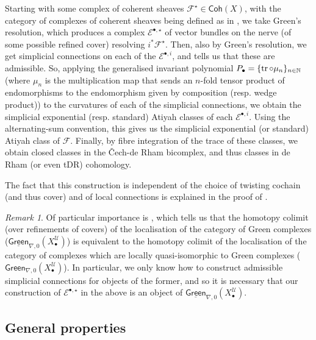 \documentclass[11pt,fleqn]{article}
\theoremstyle{plain}
\theoremstyle{definition}
\theoremstyle{remark}
\newtheorem{remark}[theorem]{Remark}
\numberwithin{equation}{theorem}
\newcommand{\cover}{\mathcal{U}}
\newcommand{\anotherbullet}{\star}
\newcommand{\gcohX}{\mathsf{Coh}(X)}
\newcommand{\greenzeroX}{\mathsf{Green}_{\nabla,0}(X_\bullet^\cover)}
\newcommand{\sgreenzeroX}{\underline{\mathsf{Green}}_{\nabla,0}(X_\bullet^\cover)}
\begin{document}
        Starting with some complex of coherent sheaves $\mathscr{F}^\anotherbullet\in\gcohX$, with the category of complexes of coherent sheaves being defined as in \cite[§4.1]{Hosgood2020a}, we take Green's resolution, which produces a complex $\mathcal{E}^{\bullet,\anotherbullet}$ of vector bundles on the nerve (of some possible refined cover) resolving $i^*\mathscr{F}^\anotherbullet$.
        Then, also by Green's resolution, we get simplicial connections on each of the $\mathcal{E}^{\bullet,i}$, and \cite[Theorem~3.5.5]{Hosgood2020a} tells us that these are admissible.
        So, applying the generalised invariant polynomial $P_\bullet = \{\tr\circ\mu_n\}_{n\in\mathbb{N}}$ (where $\mu_n$ is the multiplication map that sends an $n$-fold tensor product of endomorphisms to the endomorphism given by composition (resp. wedge product)) to the curvatures of each of the simplicial connections, we obtain the simplicial exponential (resp. standard) Atiyah classes of each $\mathcal{E}^{\bullet,i}$.
        Using the alternating-sum convention, this gives us the simplicial exponential (or standard) Atiyah class of $\mathscr{F}$.
        Finally, by fibre integration of the trace of these classes, we obtain closed classes in the Čech-de Rham bicomplex, and thus classes in de Rham (or even tDR) cohomology.

        The fact that this construction is independent of the choice of twisting cochain (and thus cover) and of local connections is explained in the proof of \cite[Theorem~2.4]{Green1980}.

        \begin{remark}
            Of particular importance is \cite[Lemma~4.2.13]{Hosgood2020a}, which tells us that the homotopy colimit (over refinements of covers) of the localisation of the category of Green complexes ($\sgreenzeroX$) is equivalent to the homotopy colimit of the localisation of the category of complexes which are locally quasi-isomorphic to Green complexes ($\greenzeroX$).
            In particular, we only know how to construct admissible simplicial connections for objects of the former, and so it is necessary that our construction of $\mathcal{E}^{\bullet,\anotherbullet}$ in the above is an object of $\sgreenzeroX$.
        \end{remark}


    \subsection{General properties}
\end{document}
